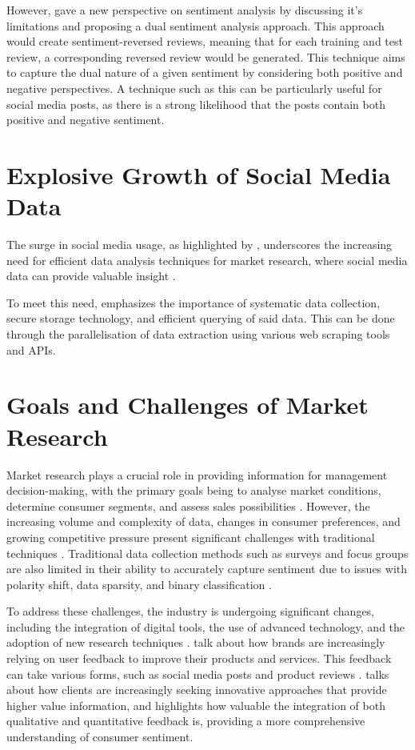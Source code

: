 However, \citet{d2019sentiment} gave a new perspective on sentiment analysis by discussing it's limitations and proposing a dual sentiment analysis approach. This approach would create sentiment-reversed reviews, meaning that for each training and test review, a corresponding reversed review would be generated. This technique aims to capture the dual nature of a given sentiment by considering both positive and negative perspectives. A technique such as this can be particularly useful for social media posts, as there is a strong likelihood that the posts contain both positive and negative sentiment.

\section{Explosive Growth of Social Media Data}
The surge in social media usage, as highlighted by \citet{dean2023social}, underscores the increasing need for efficient data analysis techniques for market research, where social media data can provide valuable insight \citep{camacho2021new, ausat2023utilisation}.

To meet this need, \citet{malic2019social} emphasizes the importance of systematic data collection, secure storage technology, and efficient querying of said data. This can be done through the parallelisation of data extraction using various web scraping tools and APIs.

\section{Goals and Challenges of Market Research}
Market research plays a crucial role in providing information for management decision-making, with the primary goals being to analyse market conditions, determine consumer segments, and assess sales possibilities \citep{cvijanovic2014market}. However, the increasing volume and complexity of data, changes in consumer preferences, and growing competitive pressure present significant challenges with traditional techniques \citep{shikovets2023digital}. Traditional data collection methods such as surveys and focus groups are also limited in their ability to accurately capture sentiment due to issues with polarity shift, data sparsity, and binary classification \citep{abirami2017survey}. 

To address these challenges, the industry is undergoing significant changes, including the integration of digital tools, the use of advanced technology, and the adoption of new research techniques \citep{barbu2013eight}. \citet{vikram2020use} talk about how brands are increasingly relying on user feedback to improve their products and services. This feedback can take various forms, such as social media posts and product reviews \citep{kanev2023leveraging}. \citet{kupec2015marketing} talks about how clients are increasingly seeking innovative approaches that provide higher value information, and \citet{gerdes2008integrative} highlights how valuable the integration of both qualitative and quantitative feedback is, providing a more comprehensive understanding of consumer sentiment.

